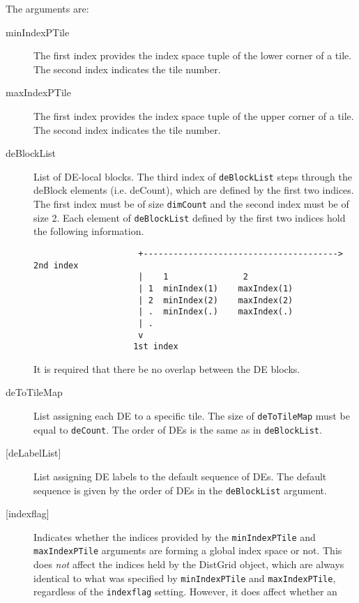        The arguments are:
       \begin{description}
       \item[minIndexPTile]
            The first index provides the index space tuple of the lower 
            corner of a tile. The second index indicates the tile number.
       \item[maxIndexPTile]
            The first index provides the index space tuple of the upper
            corner of a tile. The second index indicates the tile number.
       \item[deBlockList]
            List of DE-local blocks. The third index of {\tt deBlockList}
            steps through the deBlock elements (i.e. deCount), which are defined
            by the first two indices. 
            The first index must be of size {\tt dimCount} and the 
            second index must be of size 2. Each element of {\tt deBlockList}
            defined by the first two indices hold the following information.
            \begin{verbatim}
                     +---------------------------------------> 2nd index
                     |    1               2           
                     | 1  minIndex(1)    maxIndex(1)
                     | 2  minIndex(2)    maxIndex(2)
                     | .  minIndex(.)    maxIndex(.)
                     | .
                     v
                    1st index
            \end{verbatim}
            It is required that there be no overlap between the DE blocks.
       \item[deToTileMap]
            List assigning each DE to a specific tile. The size of 
            {\tt deToTileMap} must be equal to {\tt deCount}.
            The order of DEs is the same as in {\tt deBlockList}.
       \item[{[deLabelList]}]
            List assigning DE labels to the default sequence of DEs. The default
            sequence is given by the order of DEs in the {\tt deBlockList} 
            argument.
       \item[{[indexflag]}]
            Indicates whether the indices provided by the {\tt minIndexPTile} and
            {\tt maxIndexPTile} arguments are forming a global index space or 
            not. This does {\em not} affect the indices held by the DistGrid 
            object, which are always identical to what was specified by 
            {\tt minIndexPTile} and {\tt maxIndexPTile}, regardless of the
            {\tt indexflag} setting. However, it does affect whether an

\end{description}
